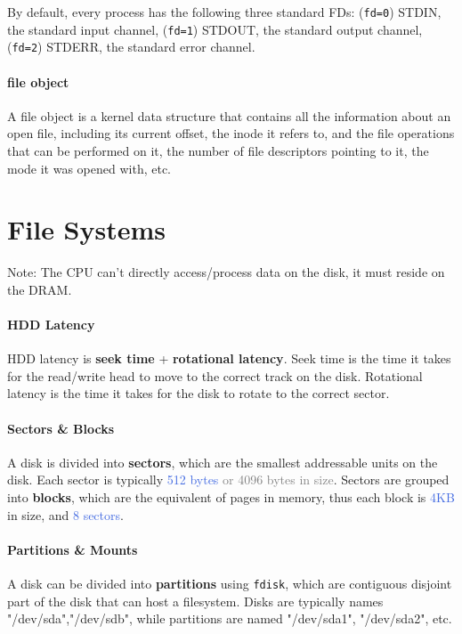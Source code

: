 \documentclass[openany,12pt]{book}
\newcommand{\code}[1]{\texttt{#1}}
\newcommand{\blue}[1]{\textcolor{RoyalBlue}{#1}}
\newcommand{\gray}[1]{\textcolor{gray}{#1}}
\begin{document}
By default, every process has the following three standard FDs: (\code{fd=0}) STDIN, the standard input channel, (\code{fd=1}) STDOUT, the standard output channel, (\code{fd=2}) STDERR, the standard error channel.

\paragraph{file object} A file object is a kernel data structure that contains all the information about an open file, including its current offset, the inode it refers to, and the file operations that can be performed on it, the number of file descriptors pointing to it, the mode it was opened with, etc. 

\section*{File Systems}

Note: The CPU can't directly access/process data on the disk, it must reside on the DRAM.

\paragraph{HDD Latency} HDD latency is \textbf{seek time} + \textbf{rotational latency}. Seek time is the time it takes for the read/write head to move to the correct track on the disk. Rotational latency is the time it takes for the disk to rotate to the correct sector. 


\paragraph{Sectors \& Blocks} A disk is divided into \textbf{sectors}, which are the smallest addressable units on the disk. Each sector is typically \blue{512 bytes}\gray{ or 4096 bytes in size}. Sectors are grouped into \textbf{blocks}, which are the equivalent of pages in memory, thus each block is \blue{4KB} in size, and \blue{8 sectors}.


\paragraph{Partitions \& Mounts} A disk can be divided into \textbf{partitions} using \code{fdisk}, which are contiguous disjoint part of the disk that can host a filesystem. Disks are typically names "/dev/sda","/dev/sdb", while partitions are named "/dev/sda1", "/dev/sda2", etc. 
\end{document}
